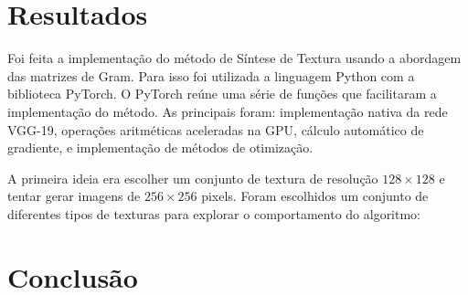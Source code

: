 \chapter{Resultados}


Foi feita a implementação do
método de Síntese de Textura
usando a abordagem das matrizes
de Gram. 
Para isso foi utilizada 
a linguagem Python com a
biblioteca PyTorch.
O PyTorch reúne uma série de
funções que facilitaram
a implementação do método.
As principais foram: implementação
nativa da rede VGG-19, operações
aritméticas aceleradas na GPU,
cálculo automático de gradiente,
e implementação de métodos de
otimização.


A primeira ideia era escolher um
conjunto de textura de resolução
$128 \times 128$ e tentar gerar
imagens de $256 \times 256$ pixels.
Foram escolhidos um conjunto de
diferentes tipos de texturas 
para explorar o comportamento
do algoritmo:








\chapter{Conclusão}






